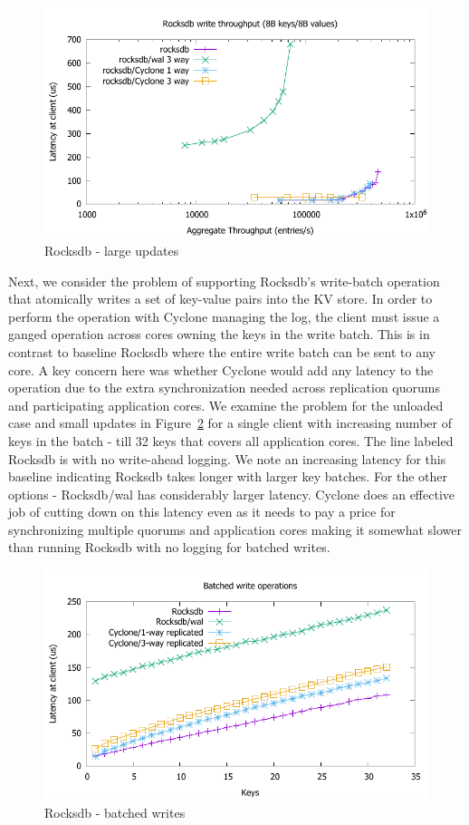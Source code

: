 \documentclass[10pt, preprint, nonatbib]{sigplanconf}
\begin{document}
\begin{figure}
\includegraphics[scale=0.6]{results2/rocksdb_256.pdf}
\caption{Rocksdb - large updates}
\label{fig:rocksdb_256}
\end{figure}

Next, we consider the problem of supporting Rocksdb's write-batch operation that
atomically writes a set of key-value pairs into the KV store. In order to
perform the operation with Cyclone managing the log, the client must issue a
ganged operation across cores owning the keys in the write batch. This is in
contrast to baseline Rocksdb where the entire write batch can be sent to any
core. A key concern here was whether Cyclone would add any latency to the
operation due to the extra synchronization needed across replication quorums and
participating application cores. We examine the problem for the unloaded case
and small updates in Figure~\ref{fig:rocksdb_multi} for a single client with
increasing number of keys in the batch - till 32 keys that covers all
application cores. The line labeled Rocksdb is with no write-ahead logging. We
note an increasing latency for this baseline indicating Rocksdb takes longer
with larger key batches. For the other options - Rocksdb/wal has considerably
larger latency. Cyclone does an effective job of cutting down on this latency
even as it needs to pay a price for synchronizing multiple quorums and
application cores making it somewhat slower than running Rocksdb with no logging
for batched writes.

\begin{figure}
\includegraphics[scale=0.6]{results2/rocksdb_multi.pdf}
\caption{Rocksdb - batched writes}
\label{fig:rocksdb_multi}
\end{figure}
\end{document}
